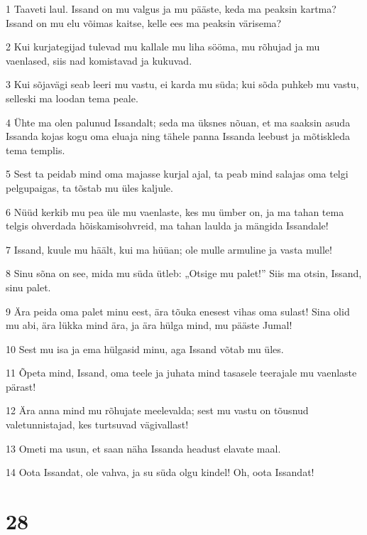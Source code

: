 \par 1 Taaveti laul. Issand on mu valgus ja mu pääste, keda ma peaksin kartma? Issand on mu elu võimas kaitse, kelle ees ma peaksin värisema?
\par 2 Kui kurjategijad tulevad mu kallale mu liha sööma, mu rõhujad ja mu vaenlased, siis nad komistavad ja kukuvad.
\par 3 Kui sõjavägi seab leeri mu vastu, ei karda mu süda; kui sõda puhkeb mu vastu, selleski ma loodan tema peale.
\par 4 Ühte ma olen palunud Issandalt; seda ma üksnes nõuan, et ma saaksin asuda Issanda kojas kogu oma eluaja ning tähele panna Issanda leebust ja mõtiskleda tema templis.
\par 5 Sest ta peidab mind oma majasse kurjal ajal, ta peab mind salajas oma telgi pelgupaigas, ta tõstab mu üles kaljule.
\par 6 Nüüd kerkib mu pea üle mu vaenlaste, kes mu ümber on, ja ma tahan tema telgis ohverdada hõiskamisohvreid, ma tahan laulda ja mängida Issandale!
\par 7 Issand, kuule mu häält, kui ma hüüan; ole mulle armuline ja vasta mulle!
\par 8 Sinu sõna on see, mida mu süda ütleb: „Otsige mu palet!” Siis ma otsin, Issand, sinu palet.
\par 9 Ära peida oma palet minu eest, ära tõuka enesest vihas oma sulast! Sina olid mu abi, ära lükka mind ära, ja ära hülga mind, mu pääste Jumal!
\par 10 Sest mu isa ja ema hülgasid minu, aga Issand võtab mu üles.
\par 11 Õpeta mind, Issand, oma teele ja juhata mind tasasele teerajale mu vaenlaste pärast!
\par 12 Ära anna mind mu rõhujate meelevalda; sest mu vastu on tõusnud valetunnistajad, kes turtsuvad vägivallast!
\par 13 Ometi ma usun, et saan näha Issanda headust elavate maal.
\par 14 Oota Issandat, ole vahva, ja su süda olgu kindel! Oh, oota Issandat!

\chapter{28}

